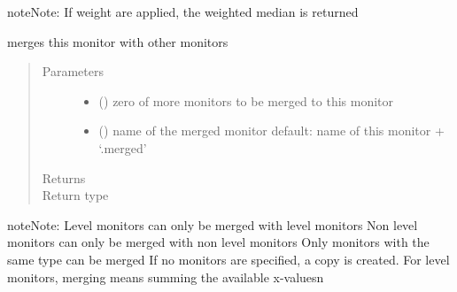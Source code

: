 \documentclass[letterpaper,10pt,english]{sphinxmanual}
\begin{document}
\begin{fulllineitems}
\begin{fulllineitems}
\begin{sphinxadmonition}{note}{Note:}
If weight are applied, the weighted median is returned
\end{sphinxadmonition}

\end{fulllineitems}


\begin{fulllineitems}
\label{\detokenize{Reference:salabim.Monitor.merge}}
merges this monitor with other monitors
\begin{quote}\begin{description}
\item[{Parameters}] \leavevmode\begin{itemize}
\item {} 
 () \textendash{} zero of more monitors to be merged to this monitor

\item {} 
 () \textendash{} name of the merged monitor 
default: name of this monitor + ‘.merged’

\end{itemize}

\item[{Returns}] \leavevmode
{}

\item[{Return type}] \leavevmode
{\hyperref[\detokenize{Reference:salabim.Monitor}]{}}

\end{description}\end{quote}

\begin{sphinxadmonition}{note}{Note:}
Level monitors can only be merged with level monitors 
Non level monitors can only be merged with non level monitors 
Only monitors with the same type can be merged 
If no monitors are specified, a copy is created. 
For level monitors, merging means summing the available x-values\textbar{}n\textbar{}
\end{sphinxadmonition}

\end{fulllineitems}



\end{fulllineitems}
\end{document}

